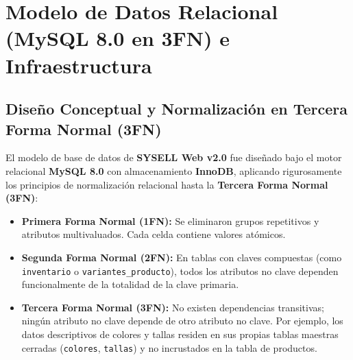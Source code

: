 \chapter{Modelo de Datos Relacional (MySQL 8.0 en 3FN) e Infraestructura}

\section{Diseño Conceptual y Normalización en Tercera Forma Normal (3FN)}
El modelo de base de datos de \textbf{SYSELL Web v2.0} fue diseñado bajo el motor relacional \textbf{MySQL 8.0} con almacenamiento \textbf{InnoDB}, aplicando rigurosamente los principios de normalización relacional hasta la \textbf{Tercera Forma Normal (3FN)}:
\begin{itemize}
    \item \textbf{Primera Forma Normal (1FN):} Se eliminaron grupos repetitivos y atributos multivaluados. Cada celda contiene valores atómicos.
    \item \textbf{Segunda Forma Normal (2FN):} En tablas con claves compuestas (como \texttt{inventario} o \texttt{variantes\_producto}), todos los atributos no clave dependen funcionalmente de la totalidad de la clave primaria.
    \item \textbf{Tercera Forma Normal (3FN):} No existen dependencias transitivas; ningún atributo no clave depende de otro atributo no clave. Por ejemplo, los datos descriptivos de colores y tallas residen en sus propias tablas maestras cerradas (\texttt{colores}, \texttt{tallas}) y no incrustados en la tabla de productos.
\end{itemize}

